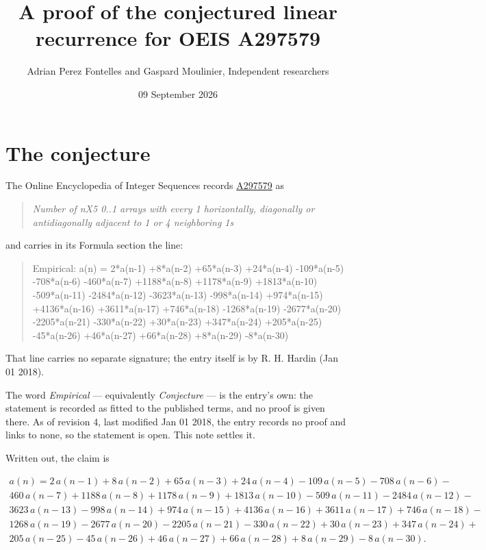\documentclass[11pt]{article}
\title{A proof of the conjectured linear recurrence for OEIS A297579}
\author{Adrian Perez Fontelles and Gaspard Moulinier, Independent researchers}
\date{09 September 2026}
\theoremstyle{definition}
\begin{document}
\maketitle
\section{The conjecture}

The Online Encyclopedia of Integer Sequences records \href{https://oeis.org/A297579}{A297579} as

\begin{quote}\itshape Number of nX5 0..1 arrays with every 1 horizontally, diagonally or antidiagonally adjacent to 1 or 4 neighboring 1s\end{quote}

and carries in its Formula section the line:

\begin{quote}\ttfamily Empirical: a(n) = 2*a(n-1) +8*a(n-2) +65*a(n-3) +24*a(n-4) -109*a(n-5) -708*a(n-6) -460*a(n-7) +1188*a(n-8) +1178*a(n-9) +1813*a(n-10) -509*a(n-11) -2484*a(n-12) -3623*a(n-13) -998*a(n-14) +974*a(n-15) +4136*a(n-16) +3611*a(n-17) +746*a(n-18) -1268*a(n-19) -2677*a(n-20) -2205*a(n-21) -330*a(n-22) +30*a(n-23) +347*a(n-24) +205*a(n-25) -45*a(n-26) +46*a(n-27) +66*a(n-28) +8*a(n-29) -8*a(n-30)\end{quote}

That line carries no separate signature; the entry itself is by R. H. Hardin (Jan 01 2018).

The word {\itshape Empirical} --- equivalently {\itshape Conjecture} --- is the entry's own: the statement is recorded as fitted to the published terms, and no proof is given there. As of revision 4, last modified Jan 01 2018, the entry records no proof and links to none, so the statement is open. This note settles it.

Written out, the claim is

\begin{multline*} a(n) = 2\,a(n-1) + 8\,a(n-2) + 65\,a(n-3) + 24\,a(n-4) - 109\,a(n-5) - 708\,a(n-6) - \\ 460\,a(n-7) + 1188\,a(n-8) + 1178\,a(n-9) + 1813\,a(n-10) - 509\,a(n-11) - 2484\,a(n-12) - \\ 3623\,a(n-13) - 998\,a(n-14) + 974\,a(n-15) + 4136\,a(n-16) + 3611\,a(n-17) + 746\,a(n-18) - \\ 1268\,a(n-19) - 2677\,a(n-20) - 2205\,a(n-21) - 330\,a(n-22) + 30\,a(n-23) + 347\,a(n-24) + \\ 205\,a(n-25) - 45\,a(n-26) + 46\,a(n-27) + 66\,a(n-28) + 8\,a(n-29) - 8\,a(n-30). \end{multline*}
\end{document}
